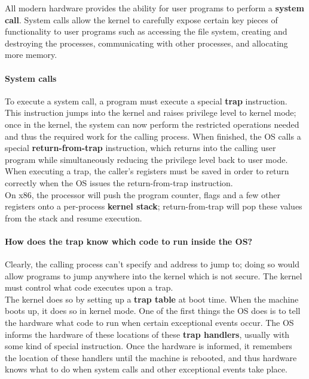 All modern hardware provides the ability for user programs to perform a 
\textbf{system call}. System calls allow the kernel to carefully expose
certain key pieces of functionality to user programs such as accessing the file
system, creating and destroying the processes, communicating with other
processes, and allocating more memory.

\paragraph{System calls}

To execute a system call, a program must execute a special \textbf{trap}
instruction. This instruction jumps into the kernel and raises privilege level
to kernel mode; once in the kernel, the system can now perform the restricted 
operations needed and thus the required work for the calling process. When 
finished, the OS calls a special \textbf{return-from-trap} instruction, which
returns into the calling user program while simultaneously reducing the 
privilege level back to user mode.\\

When executing a trap, the caller's registers must be saved in order to 
return correctly when the OS issues the return-from-trap instruction.\\

On x86, the processor will push the program counter, flags and a few other
registers onto a per-process \textbf{kernel stack}; return-from-trap
will pop these values from the stack and resume execution.

\paragraph{How does the trap know which code to run inside the OS?}

Clearly, the calling process can't specify and address to jump to; doing so 
would allow programs to jump anywhere into the kernel which is not secure. The
kernel must control what code executes upon a trap.\\

The kernel does so by setting up a \textbf{trap table} at boot time. When the
machine boots up, it does so in kernel mode. One of the first things the OS
does is to tell the hardware what code to run when certain exceptional events
occur. The OS informs the hardware of these locations of these
\textbf{trap handlers}, usually with some kind of special instruction. Once
the hardware is informed, it remembers the location of these handlers until
the machine is rebooted, and thus hardware knows what to do when system calls
and other exceptional events take place.\\

